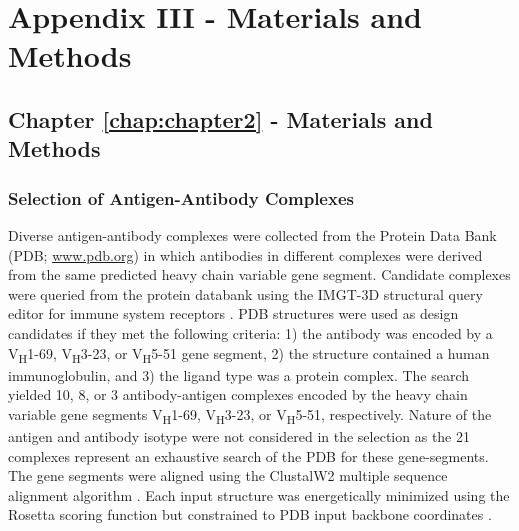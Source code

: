 \section{Appendix III - Materials and Methods}
\label{sec:appendixIII}
\par\vspace{10pt}
\subsection{Chapter \ref{chap:chapter2} - Materials and Methods}
\par\vspace{10pt}
\subsubsection{Selection of Antigen-Antibody Complexes}
Diverse antigen-antibody complexes were collected from the Protein Data Bank (PDB; \url{www.pdb.org}) in which antibodies in different complexes were derived from the same predicted heavy chain variable gene segment. Candidate complexes were queried from the protein databank using the IMGT-3D structural query editor for immune system receptors \citep{Kaas:2004kv}. PDB structures were used as design candidates if they met the following criteria: 1) the antibody was encoded by a V\textsubscript{H}1-69, V\textsubscript{H}3-23, or V\textsubscript{H}5-51 gene segment, 2) the structure contained a human immunoglobulin, and 3) the ligand type was a protein complex. The search yielded 10, 8, or 3 antibody-antigen complexes encoded by the heavy chain variable gene segments V\textsubscript{H}1-69, V\textsubscript{H}3-23, or V\textsubscript{H}5-51, respectively. Nature of the antigen and antibody isotype were not considered in the selection as the 21 complexes represent an exhaustive search of the PDB for these gene-segments. The gene segments were aligned using the ClustalW2 multiple sequence alignment algorithm \citep{Larkin:2007hz}. Each input structure was energetically minimized using the Rosetta scoring function but constrained to PDB input backbone coordinates \citep{Das:2007em}.

